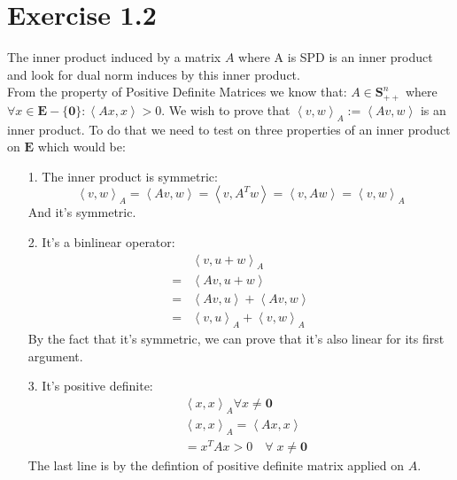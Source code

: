 \documentclass[]{article}
\begin{document}
\section*{Exercise 1.2}\label{1.2}
    The inner product induced by a matrix $A$ where A is SPD is an inner product and look for dual norm induces by this inner product. 
    \\[1.1em]
    From the property of Positive Definite Matrices we know that: $A\in \mathbf{S}_{++}^n$ where $\forall x \in \mathbf{E} - \{\mathbf{0}\}: \left\langle Ax, x \right\rangle > 0$. We wish to prove that $\left\langle v, w \right\rangle_A := \left\langle Av, w \right\rangle$ is an inner product. To do that we need to test on three properties of an inner product on $\mathbf{E}$ which would be: 
    \begin{enumerate}
        \item[1.] The inner product is symmetric: 
            $$
                \left\langle v, w \right\rangle_A = \left\langle Av, w \right\rangle = \left\langle v, A^Tw \right\rangle = \left\langle v, Aw \right\rangle = \left\langle v, w \right\rangle_A
            $$
            And it's symmetric. 
        \item[2. ] It's a binlinear operator: 
            \begin{align*}\tag{1.2.1}\label{eqn:1.2.1}
                & \left\langle v, u + w \right\rangle_A 
                \\
                =& 
                \left\langle Av, u + w \right\rangle
                \\
                =&
                \left\langle Av, u \right\rangle + \left\langle Av, w \right\rangle
                \\
                =& \left\langle v, u \right\rangle_A + \left\langle v, w \right\rangle_A
            \end{align*}
            By the fact that it's symmetric, we can prove that it's also linear for its first argument. 
        \item[3.] It's positive definite: 
            \begin{align*}\tag{1.2.2}\label{eqn:1.2.2}
                & \left\langle x, x \right\rangle_A \forall x \neq \mathbf{0}
                \\
                & \left\langle x, x \right\rangle_A = \left\langle Ax, x \right\rangle
                \\
                &= x^TAx > 0 \quad \forall \;x \neq \mathbf{0}
            \end{align*}
            The last line is by the defintion of positive definite matrix applied on $A$. 
    \end{enumerate}
\end{document}
